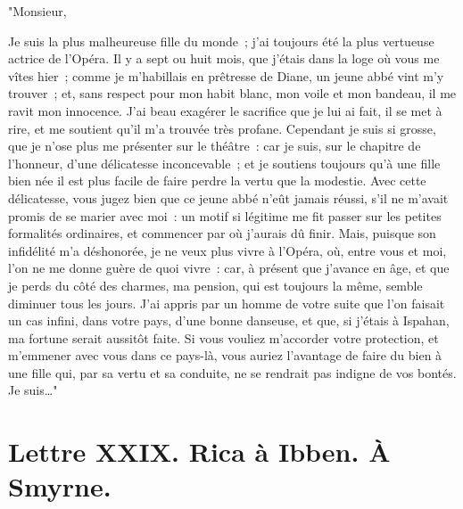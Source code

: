 \documentclass[french,twoside]{book} %
\newcommand{\dateline}[1]{\medskip{\RaggedLeft{#1}\par}\bigskip}
\begin{document}
"Monsieur,\par
Je suis la plus malheureuse fille du monde ; j’ai toujours été la plus vertueuse actrice de l’Opéra. Il y a sept ou huit mois, que j’étais dans la loge où vous me vîtes hier ; comme je m’habillais en prêtresse de Diane, un jeune abbé vint m’y trouver ; et, sans respect pour mon habit blanc, mon voile et mon bandeau, il me ravit mon innocence. J’ai beau exagérer le sacrifice que je lui ai fait, il se met à rire, et me soutient qu’il m’a trouvée très profane. Cependant je suis si grosse, que je n’ose plus me présenter sur le théâtre : car je suis, sur le chapitre de l’honneur, d’une délicatesse inconcevable ; et je soutiens toujours qu’à une fille bien née il est plus facile de faire perdre la vertu que la modestie. Avec cette délicatesse, vous jugez bien que ce jeune abbé n’eût jamais réussi, s’il ne m’avait promis de se marier avec moi : un motif si légitime me fit passer sur les petites formalités ordinaires, et commencer par où j’aurais dû finir. Mais, puisque son infidélité m’a déshonorée, je ne veux plus vivre à l’Opéra, où, entre vous et moi, l’on ne me donne guère de quoi vivre : car, à présent que j’avance en âge, et que je perds du côté des charmes, ma pension, qui est toujours la même, semble diminuer tous les jours. J’ai appris par un homme de votre suite que l’on faisait un cas infini, dans votre pays, d’une bonne danseuse, et que, si j’étais à Ispahan, ma fortune serait aussitôt faite. Si vous vouliez m’accorder votre protection, et m’emmener avec vous dans ce pays-là, vous auriez l’avantage de faire du bien à une fille qui, par sa vertu et sa conduite, ne se rendrait pas indigne de vos bontés. Je suis…"\par

\dateline{De Paris, le 2 de la lune de Chaval, 1712}
\section[{Lettre XXIX. Rica à Ibben. À Smyrne.}]{Lettre XXIX. Rica à Ibben. À Smyrne.}\renewcommand{\leftmark}{Lettre XXIX. Rica à Ibben. À Smyrne.}
\end{document}
